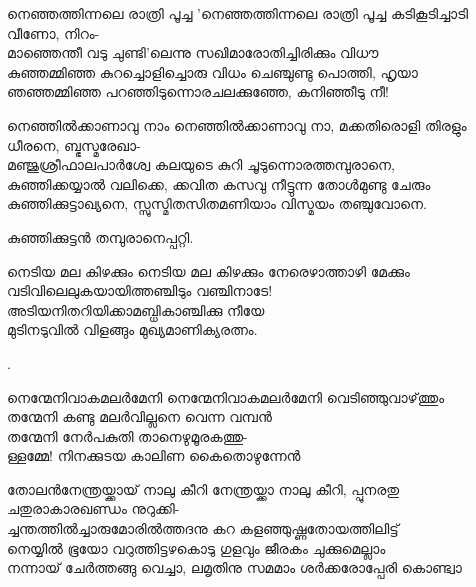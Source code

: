 \begin{enumerate}

\begin{slokam}{\VSv}{\SVL}{നെഞ്ഞത്തിന്നലെ രാത്രി പൂച്ച}
'നെഞ്ഞത്തിന്നലെ രാത്രി പൂച്ച കടികൂടിച്ചാടി വീണോ, നിറം-\\
മാഞ്ഞെന്തീ വടു ചുണ്ടി'ലെന്നു സഖിമാരോതിച്ചിരിക്കും വിധൗ\\
കുഞ്ഞമ്മിഞ്ഞ കുറച്ചൊളിച്ചൊരു വിധം ചെഞ്ചുണ്ടു പൊത്തി, ഹൃയാ\\
ഞഞ്ഞമ്മിഞ്ഞ പറഞ്ഞിടുന്നൊരചലക്കുഞ്ഞേ, കനിഞ്ഞീടു നീ!
\end{slokam}



\begin{slokam}{\VSr}{\Unk}{നെഞ്ഞിൽക്കാണാവു നാം}
നെഞ്ഞിൽക്കാണാവു നാ, മക്കതിരൊളി തിരളും ധീരനെ, ബ്ഭസ്മരേഖാ-\\
മഞ്ജുശ്രീഫാലപാർശ്വേ കലയുടെ കുറി ചൂടുന്നൊരത്തമ്പുരാനെ,\\
കുഞ്ഞിക്കയ്യാൽ വലിക്കെ, ക്കവിത കസവു നീട്ടുന്ന തോള്‍മുണ്ടു ചേരും\\
കുഞ്ഞിക്കുട്ടാഖ്യനെ, സ്സുസ്മിതസിതമണിയാം വിസ്മയം തഞ്ചുവോനെ.
\end{slokam}


കുഞ്ഞിക്കുട്ടൻ തമ്പുരാനെപ്പറ്റി.


\begin{slokam}{\VMl}{\Ull}{നെടിയ മല കിഴക്കും}
നെടിയ മല കിഴക്കും നേരെഴാത്താഴി മേക്കും\\
വടിവിലെലുകയായിത്തഞ്ചിടും വഞ്ചിനാടേ!\\
അടിയനിതറിയിക്കാമബ്ധികാഞ്ചിക്കു നീയേ\\
മുടിനടുവിൽ വിളങ്ങും മുഖ്യമാണിക്യരത്നം.
\end{slokam}


.


\begin{slokam}{\VVt}{\Kund}{നെന്മേനിവാകമലർമേനി}
നെന്മേനിവാകമലർമേനി വെടിഞ്ഞുവാഴ്‌ത്തും\\
തന്മേനി കണ്ടു മലർവില്ലനെ വെന്ന വമ്പൻ\\
തന്മേനി നേർപകുതി താനെഴുമൂരകത്തു-\\
ള്ളമ്മേ! നിനക്കുടയ കാലിണ കൈതൊഴുന്നേൻ
\end{slokam}



\begin{slokam}{\VSr}{തോലൻ}{നേന്ത്രയ്ക്കായ് നാലു കീറി}
നേന്ത്രയ്ക്കാ നാലു കീറി, പ്പുനരതു ചതുരാകാരഖണ്ഡം നുറുക്കി-\\
ച്ചന്തത്തിൽച്ചാരുമോരിൽത്തദനു കറ കളഞ്ഞുഷ്ണതോയത്തിലിട്ട്\\
നെയ്യിൽ ഭൂയോ വറുത്തിട്ടഴകൊടു ഗുളവും ജീരകം ചുക്കുമെല്ലാം\\
നന്നായ് ചേർത്തങ്ങു വെച്ചാ, ലമൃതിനു സമമാം ശർക്കരോപ്പേരി കൊണ്ട്വാ
\end{slokam}


\end{enumerate}
